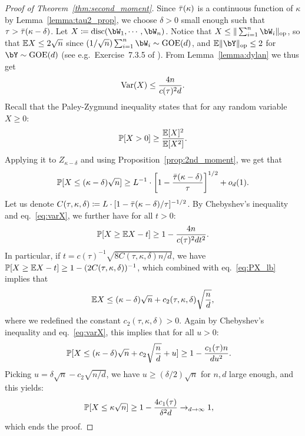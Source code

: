 \begin{proof}[Proof of Theorem~\ref{thm:second_moment}]
\myskip 
    Since ${\bar{\tau}}(\kappa)$ is a continuous function of $\kappa$ by Lemma~\ref{lemma:tau2_prop}, we choose $\delta > 0$ small enough such 
    that $\tau > {\bar{\tau}}(\kappa-\delta)$.
    Let $X \coloneqq \disc(\bW_1, \cdots, \bW_n)$.
    Notice that $X \leq \|\sum_{i=1}^n \bW_i\|_\op$, 
    so that $\mathbb{E} X \leq 2 \sqrt{n}$ since $(1/\sqrt{n})\sum_{i=1}^n \bW_i \sim \GOE(d)$, 
    and $\EE \|\bY\|_\op \leq 2$ for $\bY \sim \GOE(d)$ (see e.g.\ Exercise~7.3.5 of \cite{vershynin2018high}).
    From Lemma~\ref{lemma:dylan} we thus get 
    \begin{align}\label{eq:varX}
        \mathrm{Var}(X) \leq \frac{4n}{c(\tau)^2 d}.
    \end{align}
    Recall that the Paley-Zygmund inequality states that for any random variable $X \geq 0$:
    \begin{align*}
        \mathbb{P}[X > 0] \geq \frac{\mathbb{E}[X]^2}{\mathbb{E}[X^2]}.
    \end{align*} 
    Applying it to $Z_{\kappa - \delta}$ and using Proposition~\ref{prop:2nd_moment}, we get that 
    \begin{equation}\label{eq:PX_lb}
        \mathbb{P}[X \leq (\kappa-\delta) \sqrt{n}] \geq L^{-1} \cdot \left[1 - \frac{{\bar{\tau}}(\kappa-\delta)}{\tau}\right]^{1/2} + o_d(1).
    \end{equation}
    Let us denote $C(\tau,\kappa,\delta) \coloneqq L \cdot [1 - {\bar{\tau}}(\kappa-\delta)/\tau]^{-1/2}$.
    By Chebyshev's inequality and eq.~\eqref{eq:varX}, we further have for all $t > 0$:
    \begin{align*}
        \mathbb{P}[X \geq \mathbb{E} X - t] \geq 1 - \frac{4n}{c(\tau)^2 d t^2}.
    \end{align*}
    In particular, if $t = c(\tau)^{-1} \sqrt{8 C(\tau, \kappa, \delta) n / d}$, we have $\mathbb{P}[X \geq \mathbb{E} X - t] \geq 1 - (2C(\tau,\kappa,\delta))^{-1}$, which combined 
    with eq.~\eqref{eq:PX_lb} implies that  
    \begin{equation*}
        \mathbb{E} X \leq (\kappa-\delta) \sqrt{n} + c_2(\tau,\kappa,\delta) \sqrt{\frac{n}{d}}, 
    \end{equation*}
    where we redefined the constant $c_2(\tau,\kappa,\delta) > 0$.
    Again by Chebyshev's inequality and eq.~\eqref{eq:varX}, this implies that for all $u > 0$:
    \begin{align*}
        \mathbb{P}[X \leq (\kappa-\delta) \sqrt{n} + c_2 \sqrt{\frac{n}{d}} + u] &\geq 1 - \frac{c_1(\tau) n}{d u^2}.
    \end{align*}
    Picking $u = \delta \sqrt{n} - c_2 \sqrt{n/d}$, we have $u \geq (\delta/2) \sqrt{n}$ for $n,d$ large enough, and this yields:
    \begin{align*}
        \mathbb{P}[X \leq \kappa \sqrt{n}] &\geq 1 - \frac{4 c_1(\tau)}{\delta^2 d} \to_{d \to \infty} 1,
    \end{align*}
    which ends the proof.
\end{proof}

